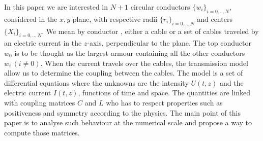 In this paper we are interested in  $N+1$ circular conductors $\{w_i\}_{i=0,..,N}$, considered in the $x,y$-plane, with respective radii $\{r_i\}_{i=0,..,N}$ and centers $\{X_i\}_{i=0,..,N}$. We mean by conductor  , either a cable or a set of cables traveled by an electric  current in the $z$-axis, perpendicular to the plane. The top conductor $w_0$ is to be thought as the largest armour containing all the other conductors $w_i \, (i \ne 0)$. When the current travels over the cables, the transmission model allow us to determine the coupling between the cables. The model is a set of differential equations where the unknowns are the intensity $U(t,z)$ and the electric current $I(t,z)$, functions of time and space. The quantities are linked with coupling matrices $C$ and $L$ who has to respect properties such as positiveness and symmetry according to the physics. The main point of this paper is to analyse such behaviour at the numerical scale and propose a way to compute those matrices. 


